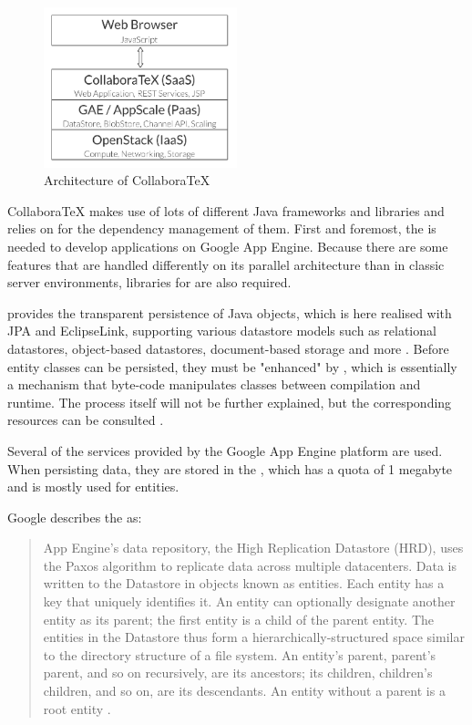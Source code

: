 \begin{figure}[H]
	\centering
		\includegraphics[width=0.5\textwidth]{images/collaboratex_architecture.pdf}
	\caption{Architecture of CollaboraTeX}
\end{figure}

CollaboraTeX makes use of lots of different Java frameworks and libraries and relies on  for the dependency management of them. First and foremost, the  is needed to develop applications on Google App Engine. Because there are some features that are handled differently on its parallel architecture than in classic server environments, libraries for  are also required. 

 provides the transparent persistence of Java objects, which is here realised with JPA and EclipseLink, supporting various datastore models such as relational datastores, object-based datastores, document-based storage and more \cite{website:data-nucleus}. Before entity classes can be persisted, they must be "enhanced" by , which is essentially a mechanism that byte-code manipulates classes between compilation and runtime. The process itself will not be further explained, but the corresponding resources can be consulted \cite{website:data-nucleus-enhancement}.

Several of the services provided by the Google App Engine platform are used. When persisting data, they are stored in the , which has a quota of 1 megabyte and is mostly used for entities.

\pagebreak

Google describes the  as:

\begin{quote}
App Engine's data repository, the High Replication Datastore (HRD), uses the Paxos algorithm to replicate data across multiple datacenters. Data is written to the Datastore in objects known as entities. Each entity has a key that uniquely identifies it. An entity can optionally designate another entity as its parent; the first entity is a child of the parent entity. The entities in the Datastore thus form a hierarchically-structured space similar to the directory structure of a file system. An entity's parent, parent's parent, and so on recursively, are its ancestors; its children, children's children, and so on, are its descendants. An entity without a parent is a root entity \cite{website:gae-datastore}.
\end{quote}

